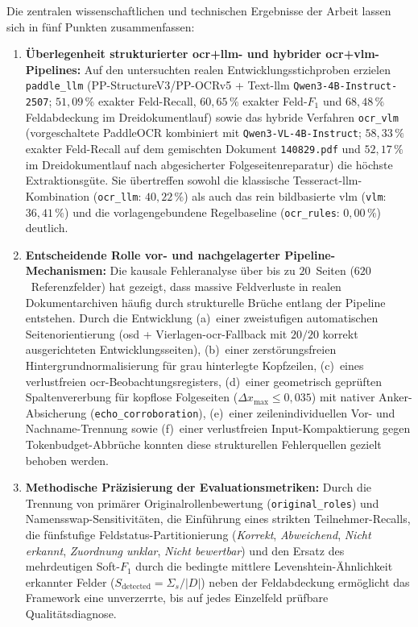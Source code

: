 Die zentralen wissenschaftlichen und technischen Ergebnisse der Arbeit lassen sich in fünf Punkten zusammenfassen:
\begin{enumerate}
  \item \textbf{Überlegenheit strukturierter \ac{ocr}+\ac{llm}- und hybrider \ac{ocr}+\ac{vlm}-Pipelines:} Auf den untersuchten realen Entwicklungsstichproben erzielen \texttt{paddle\_llm} (PP-StructureV3/PP-OCRv5 + Text-\ac{llm} \texttt{Qwen3-4B-Instruct-2507}; $51{,}09\,\%$ exakter Feld-Recall, $60{,}65\,\%$ exakter Feld-$F_1$ und $68{,}48\,\%$ Feldabdeckung im Dreidokumentlauf) sowie das hybride Verfahren \texttt{ocr\_vlm} (vorgeschaltete PaddleOCR kombiniert mit \texttt{Qwen3-VL-4B-Instruct}; $58{,}33\,\%$ exakter Feld-Recall auf dem gemischten Dokument \texttt{140829.pdf} und $52{,}17\,\%$ im Dreidokumentlauf nach abgesicherter Folgeseitenreparatur) die höchste Extraktionsgüte. Sie übertreffen sowohl die klassische Tesseract-\ac{llm}-Kombination (\texttt{ocr\_llm}: $40{,}22\,\%$) als auch das rein bildbasierte \ac{vlm} (\texttt{vlm}: $36{,}41\,\%$) und die vorlagengebundene Regelbaseline (\texttt{ocr\_rules}: $0{,}00\,\%$) deutlich.
  \item \textbf{Entscheidende Rolle vor- und nachgelagerter Pipeline-Mechanismen:} Die kausale Fehleranalyse über bis zu $20$~Seiten ($620$~Referenzfelder) hat gezeigt, dass massive Feldverluste in realen Dokumentarchiven häufig durch strukturelle Brüche entlang der Pipeline entstehen. Durch die Entwicklung (a)~einer zweistufigen automatischen Seitenorientierung (\ac{osd} + Vierlagen-\ac{ocr}-Fallback mit $20/20$ korrekt ausgerichteten Entwicklungsseiten), (b)~einer zerstörungsfreien Hintergrundnormalisierung für grau hinterlegte Kopfzeilen, (c)~eines verlustfreien \ac{ocr}-Beobachtungsregisters, (d)~einer geometrisch geprüften Spaltenvererbung für kopflose Folgeseiten ($\Delta x_{\max} \le 0{,}035$) mit nativer Anker-Absicherung (\texttt{echo\_corroboration}), (e)~einer zeilenindividuellen Vor- und Nachname-Trennung sowie (f)~einer verlustfreien Input-Kompaktierung gegen Tokenbudget-Abbrüche konnten diese strukturellen Fehlerquellen gezielt behoben werden.
  \item \textbf{Methodische Präzisierung der Evaluationsmetriken:} Durch die Trennung von primärer Originalrollenbewertung (\texttt{original\_roles}) und Namensswap-Sensitivitäten, die Einführung eines strikten Teilnehmer-Recalls, die fünfstufige Feldstatus-Partitionierung (\emph{Korrekt}, \emph{Abweichend}, \emph{Nicht erkannt}, \emph{Zuordnung unklar}, \emph{Nicht bewertbar}) und den Ersatz des mehrdeutigen Soft-$F_1$ durch die bedingte mittlere Levenshtein-Ähnlichkeit erkannter Felder ($S_{\mathrm{detected}} = \Sigma_s / |D|$) neben der Feldabdeckung ermöglicht das Framework eine unverzerrte, bis auf jedes Einzelfeld prüfbare Qualitätsdiagnose.

\end{enumerate}
